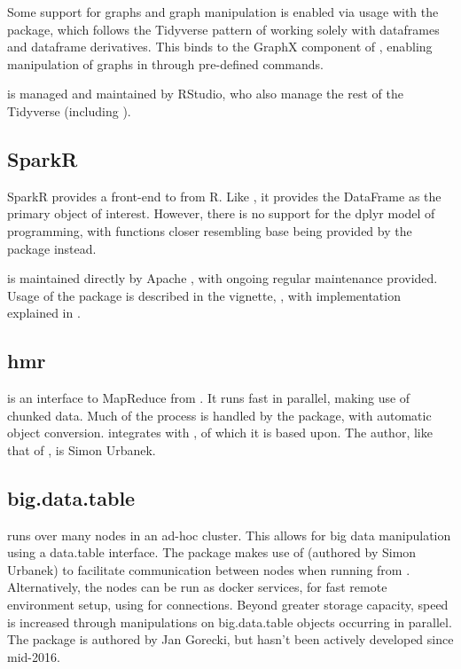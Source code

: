 Some support for graphs and graph manipulation is enabled via usage with the  package, which follows the Tidyverse pattern of working solely with dataframes and dataframe derivatives\cite{kuo18}.
This binds to the GraphX component of , enabling manipulation of graphs in  through pre-defined commands.

 is managed and maintained by RStudio, who also manage the rest
of the Tidyverse (including ).

\subsection{SparkR}\label{subsec:sparkr}

SparkR provides a front-end to  from R\cite{venkataraman20:_spark}.
Like , it provides the DataFrame as the primary object of interest.
However, there is no support for the dplyr model of programming, with functions closer resembling base \R{} being provided by the package instead.

 is maintained directly by Apache , with ongoing regular
maintenance provided.
Usage of the package is described in the vignette, \textcite{venktaraman19:spark-pract-guide}, with implementation explained in \cite{venkataraman2016sparkr}.

\subsection{hmr}\label{subsec:hmr}

 is an interface to MapReduce from \R{}\cite{urbanek20}.
It runs fast in parallel, making use of chunked data.
Much of the process is handled by the package, with automatic \R{} object conversion.
 integrates with
, of which it is based upon.
The author, like that of , is Simon Urbanek.

\subsection{big.data.table}\label{subsec:big.data.table}

 runs  over many nodes in an ad-hoc
cluster\cite{gorecki16}.
This allows for big data manipulation using a data.table interface.
The package makes use of  (authored by Simon Urbanek) to facilitate communication between nodes when running from \R{}.
Alternatively, the nodes can be run as docker services, for fast remote environment setup, using  for connections.
Beyond greater storage capacity, speed is increased through manipulations on big.data.table objects occurring in parallel.
The package is authored by Jan Gorecki, but hasn't been actively developed since mid-2016.
